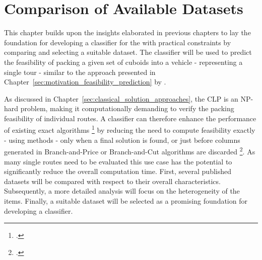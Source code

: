 \chapter{Comparison of Available Datasets}
\label{sec:dataset_selection}

This chapter builds upon the insights elaborated in previous chapters to lay the foundation
for developing a classifier for the  with practical constraints by comparing and
selecting a suitable dataset. The classifier will be used to predict the feasibility of packing a
given set of cuboids into a vehicle - representing a single tour - similar to the approach presented
in Chapter~\ref{sec:motivation_feasibility_prediction} by \citeauthor{zhang_learning-based_2022}.

As discussed in Chapter~\ref{sec:classical_solution_approaches}, the \gls{CLP} is an NP-hard problem,
making it computationally demanding to verify the packing feasibility of individual routes.
A classifier can therefore enhance the performance of existing exact algorithms \footcite[cf.][]{tamke_branch-and-cut_2024}
by reducing the need to compute feasibility exactly - using  methods - only when a
final solution is found, or just before columns generated in Branch-and-Price or Branch-and-Cut
algorithms are discarded \footcite[cf.][pp. 9--11]{zhang_learning-based_2022}. As many single routes
need to be evaluated this use case has the potential to significantly reduce the overall
computation time. First, several published  datasets will be compared with respect
to their overall characteristics. Subsequently, a more detailed analysis will focus on the
heterogeneity of the items. Finally, a suitable dataset will be selected as a promising foundation
for developing a classifier.

%


